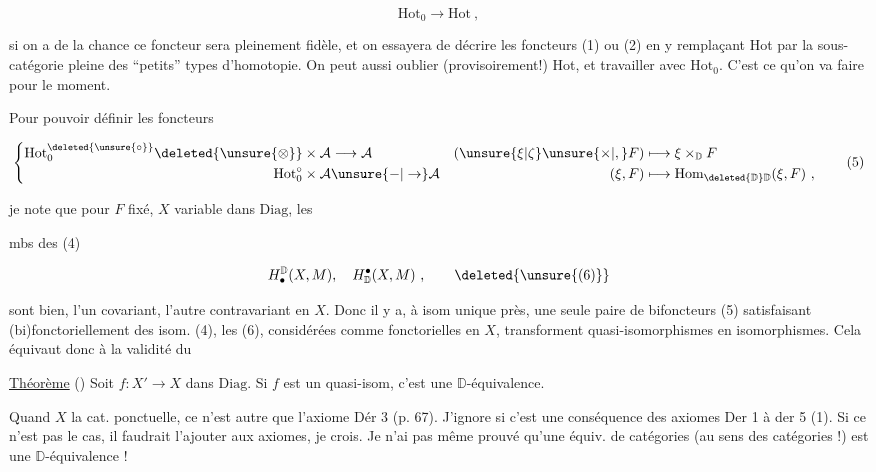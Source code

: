\[\mathrm{Hot}_0\longrightarrow\mathrm{Hot}\ ,\]

si on a de la chance ce foncteur sera pleinement fidèle, et on  essayera de décrire les foncteurs (1) ou (2) en y remplaçant Hot par la sous-catégorie pleine des ``petits'' types d'homotopie. On peut aussi oublier (provisoirement!) Hot, et travailler avec $\mathrm{Hot}_0$. C'est ce qu'on va faire pour le moment.

Pour pouvoir définir les foncteurs

\[
\left\{\begin{aligned}
\mathrm{Hot}_0^{\deleted{\unsure{\circ}}}\deleted{\unsure{\otimes}}\times\mathcal A&\longrightarrow\mathcal A&
(\unsure{\xi|\zeta}\unsure{\times|,} F)&\longmapsto\xi\times_{\mathbb D}F\\
\mathrm{Hot}_0^\circ\times\mathcal A&\unsure{-|\to}\mathcal A&
(\xi,F)&\longmapsto\mathrm{Hom}_{\deleted{\mathbb D}\mathbb D}(\xi,F)\ ,
\end{aligned}\right.\tag*{(5)}
\]

je note que pour $F$ fixé, $X$ variable dans $\mathrm{Diag}$, les


 mbs des (4)

\[H^{\mathbb D}_{\bullet}(X,M),\quad H_{\mathbb D}^{\bullet}(X,M)\ ,\tag*{\deleted{\unsure{(6)}}}\]

sont bien, l'un covariant, l'autre contravariant en $X$. Donc il y a, à isom unique près, une seule paire de bifoncteurs (5) satisfaisant (bi)fonctoriellement des isom. (4),  les  (6), considérées comme fonctorielles en $X$, transforment quasi-isomorphismes en isomorphismes. Cela équivaut donc à la validité du

\uline{Théorème} () Soit $f:X'\longrightarrow X$ dans $\mathrm{Diag}$. Si $f$ est un quasi-isom, c'est une $\mathbb D$-équivalence.


Quand $X$  la cat. ponctuelle, ce n'est  autre que l'axiome Dér 3 (p. 67).  J'ignore si c'est une conséquence des axiomes Der 1 à der 5 (1). Si ce n'est pas le cas, il faudrait l'ajouter aux axiomes, je crois. Je n'ai pas même prouvé qu'une équiv. de catégories  (au sens des catégories !) est une $\mathbb D$-équivalence !

